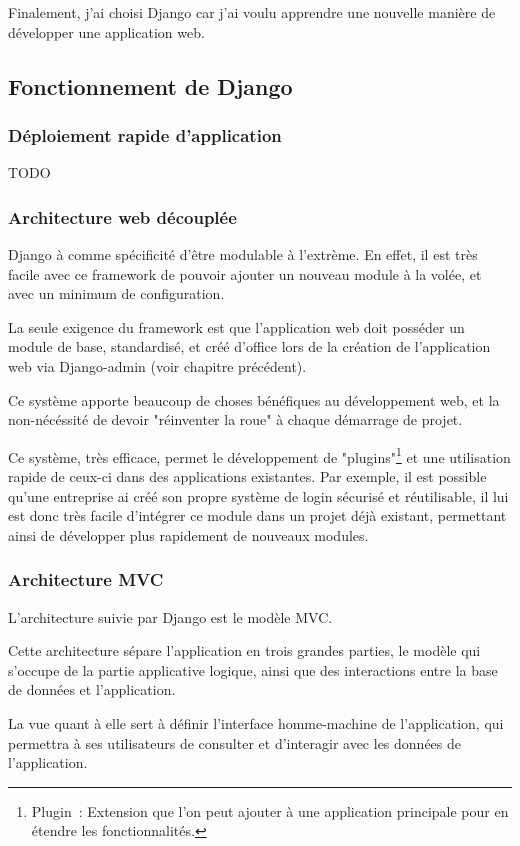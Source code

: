 \documentclass[12pt,table,a4paper]{report}
\begin{document}
Finalement, j'ai choisi Django car j'ai voulu apprendre une nouvelle manière de développer une application web.

\subsection{Fonctionnement de Django}
\subsubsection{Déploiement rapide d'application}
TODO

\subsubsection{Architecture web découplée}
Django à comme spécificité d'être modulable à l'extrème. En effet, il est très facile avec ce framework de pouvoir ajouter un nouveau module à la volée, et avec un minimum de configuration.

La seule exigence du framework est que l'application web doit posséder un module de base, standardisé, et créé d'office lors de la création de l'application web via Django-admin (voir chapitre précédent).

Ce système apporte beaucoup de choses bénéfiques au développement web, et la non-nécéssité de devoir "réinventer la roue" à chaque démarrage de projet.

Ce système, très efficace, permet le développement de "plugins"\footnote{Plugin : Extension que l'on peut ajouter à une application principale pour en étendre les fonctionnalités.} et une utilisation rapide de ceux-ci dans des applications existantes.
Par exemple, il est possible qu'une entreprise ai créé son propre système de login sécurisé et réutilisable, il lui est donc très facile d'intégrer ce module dans un projet déjà existant, permettant ainsi de développer plus rapidement de nouveaux modules.

\subsubsection{Architecture MVC}
L'architecture suivie par Django est le modèle MVC.

Cette architecture sépare l'application en trois grandes parties, le modèle qui s'occupe de la partie applicative logique, ainsi que des interactions entre la base de données et l'application.

La vue quant à elle sert à définir l'interface homme-machine de l'application, qui permettra à ses utilisateurs de consulter et d'interagir avec les données de l'application.
\end{document}
